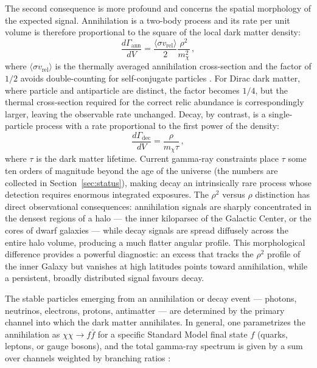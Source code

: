 The second consequence is more profound and concerns the spatial morphology of the expected signal.
Annihilation is a two-body process and its rate per unit volume is therefore proportional to the square of the local dark matter density:
%
\begin{equation}
	\frac{d\Gamma_\text{ann}}{dV} = \frac{\langle \sigma v_\text{rel} \rangle}{2} \frac{\rho^2}{m_\chi^2} \,,
	\label{eq:ann_rate}
\end{equation}
%
where $\langle \sigma v_\text{rel} \rangle$ is the thermally averaged annihilation cross-section and the factor of $1/2$ avoids double-counting for self-conjugate particles \cite{Hooper:2024}.
For Dirac dark matter, where particle and antiparticle are distinct, the factor becomes $1/4$, but the thermal cross-section required for the correct relic abundance is correspondingly larger, leaving the observable rate unchanged.
Decay, by contrast, is a single-particle process with a rate proportional to the first power of the density:
%
\begin{equation}
	\frac{d\Gamma_\text{dec}}{dV} = \frac{\rho}{m_\chi \tau} \,,
	\label{eq:dec_rate}
\end{equation}
%
where $\tau$ is the dark matter lifetime.
Current gamma-ray constraints place $\tau$ some ten orders of magnitude beyond the age of the universe (the numbers are collected in Section~\ref{sec:status}), making decay an intrinsically rare process whose detection requires enormous integrated exposures.
The $\rho^2$ versus $\rho$ distinction has direct observational consequences: annihilation signals are sharply concentrated in the densest regions of a halo --- the inner kiloparsec of the Galactic Center, or the cores of dwarf galaxies --- while decay signals are spread diffusely across the entire halo volume, producing a much flatter angular profile.
This morphological difference provides a powerful diagnostic: an excess that tracks the $\rho^2$ profile of the inner Galaxy but vanishes at high latitudes points toward annihilation, while a persistent, broadly distributed signal favours decay.

The stable particles emerging from an annihilation or decay event --- photons, neutrinos, electrons,
protons, antimatter --- are determined by the primary channel into which the dark matter annihilates.
In general, one parametrizes the annihilation as $\chi\chi \to f\bar{f}$ for a specific Standard Model final state $f$ (quarks, leptons, or gauge bosons), and the total gamma-ray spectrum is given by a sum over channels weighted by branching ratios \cite{Cirelli:2024ssz,Cirelli:2010xx,Arina:2023eic}:

